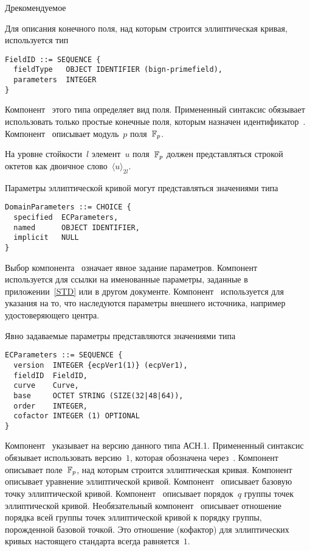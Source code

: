 \begin{appendix}{Д}{рекомендуемое}
\label{ASN.Field}

Для описания конечного поля, над которым строится эллиптическая кривая, 
используется тип
\begin{verbatim}
FieldID ::= SEQUENCE {
  fieldType   OBJECT IDENTIFIER (bign-primefield),
  parameters  INTEGER
}
\end{verbatim}

Компонент~ этого типа определяет вид поля.
Примененный синтаксис обязывает использовать только простые 
конечные поля, которым назначен идентификатор~.
Компонент~ описывает модуль~$p$ поля~$\mathbb{F}_p$.

На уровне стойкости~$l$
элемент~$u$ поля~$\mathbb{F}_p$ должен представляться строкой 
октетов как двоичное слово~$\langle u\rangle_{2l}$.

\label{ASN.EC}

Параметры эллиптической кривой 
могут представляться значениями типа
\begin{verbatim}
DomainParameters ::= CHOICE {
  specified  ECParameters,
  named      OBJECT IDENTIFIER,
  implicit   NULL 
}
\end{verbatim}

Выбор компонента~ означает явное задание параметров. 
%
Компонент~ используется для ссылки на именованные параметры, 
заданные в приложении~\ref{STD} или в другом документе.
%
Компонент~ используется для указания на то, что наследуются
параметры внешнего источника, например удостоверяющего центра.

Явно задаваемые параметры представляются значениями типа
\begin{verbatim}
ECParameters ::= SEQUENCE {
  version  INTEGER {ecpVer1(1)} (ecpVer1),
  fieldID  FieldID,
  curve    Curve,
  base     OCTET STRING (SIZE(32|48|64)),
  order    INTEGER,
  cofactor INTEGER (1) OPTIONAL
}
\end{verbatim}

Компонент~ указывает на версию данного типа АСН.1.
Примененный синтаксис обязывает использовать версию~$1$,
которая обозначена через~.
%
Компонент~ описывает поле~$\mathbb{F}_p$, 
над которым строится эллиптическая кривая.
%
Компонент~ описывает уравнение эллиптической кривой.
%
Компонент~ описывает базовую точку эллиптической кривой.
%
Компонент~ описывает порядок~$q$ 
группы точек эллиптической кривой.
%
Необязательный компонент~ описывает отношение
порядка всей группы точек эллиптической кривой к порядку группы, 
порожденной базовой точкой.                        
Это отношение (кофактор) для эллиптических кривых
настоящего стандарта всегда равняется~$1$.


\end{appendix}
